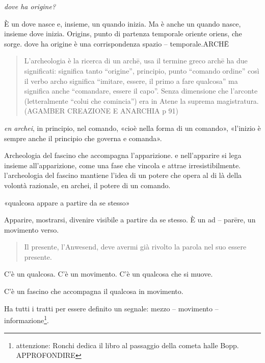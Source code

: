 \documentclass{gs}
\begin{document}
\emph{dove ha origine?}

È un dove nasce e, insieme, un quando inizia. Ma è anche un quando nasce, insieme dove inizia. Origins, punto di partenza temporale oriente oriens, che sorge. dove ha origine è una corrispondenza spazio – temporale.ARCHĒ


\begin{quote}
\begin{sf}
\small
L'archeologia è la ricerca di un archē, usa il termine greco archē ha due significati: significa tanto “origine”, principio, punto “comando ordine” così il verbo archo significa “imitare, essere, il primo a fare qualcosa” ma significa anche “comandare, essere il capo”. Senza dimensione che l'arconte (letteralmente “colui che comincia”) era in Atene la suprema magistratura. (AGAMBER CREAZIONE E ANARCHIA p 91) 
\end{sf}
\end{quote}

\emph{en archei}, in principio, nel comando, «cioè nella forma di un comando», «l'inizio è sempre anche il principio che governa e comanda».

Archeologia del fascino che accompagna l'apparizione. e nell'apparire si lega insieme all'apparizione, come una fase che vincola e attrae irresistibilmente. l'archeologia del fascino mantiene l'idea di un potere che opera al di là della volontà razionale, en archei, il potere di un comando.

«qualcosa appare a partire da se stesso» \cite{agamben19}

Apparire, mostrarsi, divenire visibile a partire da se stesso. È un ad – parēre, un movimento verso.

\begin{quote}
\begin{sf}
\small
Il presente, l'Anwesend, deve avermi già rivolto la parola nel suo essere presente. \cite{agamben19}
\end{sf}
\end{quote}

C'è un qualcosa. C'è un movimento. C'è un qualcosa che si muove.

C'è un fascino che accompagna il qualcosa in movimento.

Ha tutti i tratti per essere definito un segnale: mezzo – movimento – informazione\footnote{attenzione: Ronchi dedica il libro al passaggio della cometa halle Bopp. APPROFONDIRE}. 
\end{document}
